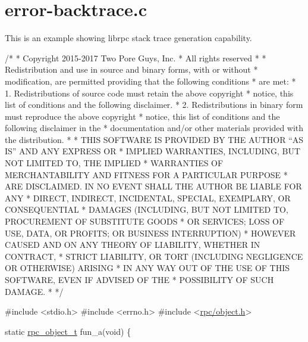 \hypertarget{error-backtrace_8c-example}{}\section{error-\/backtrace.\+c}
This is an example showing librpc stack trace generation capability.


\begin{DoxyCodeInclude}
\textcolor{comment}{/*}
\textcolor{comment}{ * Copyright 2015-2017 Two Pore Guys, Inc.}
\textcolor{comment}{ * All rights reserved}
\textcolor{comment}{ *}
\textcolor{comment}{ * Redistribution and use in source and binary forms, with or without}
\textcolor{comment}{ * modification, are permitted providing that the following conditions}
\textcolor{comment}{ * are met:}
\textcolor{comment}{ * 1. Redistributions of source code must retain the above copyright}
\textcolor{comment}{ *    notice, this list of conditions and the following disclaimer.}
\textcolor{comment}{ * 2. Redistributions in binary form must reproduce the above copyright}
\textcolor{comment}{ *    notice, this list of conditions and the following disclaimer in the}
\textcolor{comment}{ *    documentation and/or other materials provided with the distribution.}
\textcolor{comment}{ *}
\textcolor{comment}{ * THIS SOFTWARE IS PROVIDED BY THE AUTHOR ``AS IS'' AND ANY EXPRESS OR}
\textcolor{comment}{ * IMPLIED WARRANTIES, INCLUDING, BUT NOT LIMITED TO, THE IMPLIED}
\textcolor{comment}{ * WARRANTIES OF MERCHANTABILITY AND FITNESS FOR A PARTICULAR PURPOSE}
\textcolor{comment}{ * ARE DISCLAIMED.  IN NO EVENT SHALL THE AUTHOR BE LIABLE FOR ANY}
\textcolor{comment}{ * DIRECT, INDIRECT, INCIDENTAL, SPECIAL, EXEMPLARY, OR CONSEQUENTIAL}
\textcolor{comment}{ * DAMAGES (INCLUDING, BUT NOT LIMITED TO, PROCUREMENT OF SUBSTITUTE GOODS}
\textcolor{comment}{ * OR SERVICES; LOSS OF USE, DATA, OR PROFITS; OR BUSINESS INTERRUPTION)}
\textcolor{comment}{ * HOWEVER CAUSED AND ON ANY THEORY OF LIABILITY, WHETHER IN CONTRACT,}
\textcolor{comment}{ * STRICT LIABILITY, OR TORT (INCLUDING NEGLIGENCE OR OTHERWISE) ARISING}
\textcolor{comment}{ * IN ANY WAY OUT OF THE USE OF THIS SOFTWARE, EVEN IF ADVISED OF THE}
\textcolor{comment}{ * POSSIBILITY OF SUCH DAMAGE.}
\textcolor{comment}{ *}
\textcolor{comment}{ */}

\textcolor{preprocessor}{#include <stdio.h>}
\textcolor{preprocessor}{#include <errno.h>}
\textcolor{preprocessor}{#include <\hyperlink{object_8h}{rpc/object.h}>}

\textcolor{keyword}{static} \hyperlink{object_8h_ab365f726b4975c0c8376b808d111d01b}{rpc\_object\_t}
fun\_a(\textcolor{keywordtype}{void})
\{


\end{DoxyCodeInclude}
